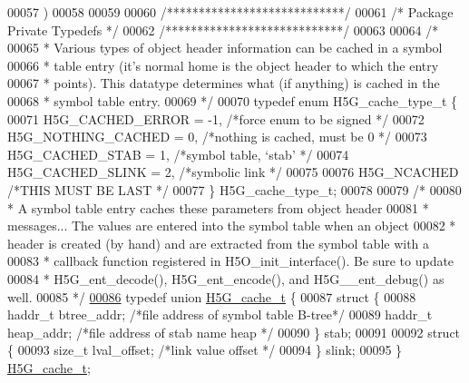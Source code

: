 \begin{DoxyCode}
00057 \textcolor{preprocessor}{    )}
00058 
00059 
00060 \textcolor{comment}{/****************************/}
00061 \textcolor{comment}{/* Package Private Typedefs */}
00062 \textcolor{comment}{/****************************/}
00063 
00064 \textcolor{comment}{/*}
00065 \textcolor{comment}{ * Various types of object header information can be cached in a symbol}
00066 \textcolor{comment}{ * table entry (it's normal home is the object header to which the entry}
00067 \textcolor{comment}{ * points).  This datatype determines what (if anything) is cached in the}
00068 \textcolor{comment}{ * symbol table entry.}
00069 \textcolor{comment}{ */}
00070 \textcolor{keyword}{typedef} \textcolor{keyword}{enum} H5G\_cache\_type\_t \{
00071     H5G\_CACHED\_ERROR    = -1,   \textcolor{comment}{/*force enum to be signed            */}
00072     H5G\_NOTHING\_CACHED  = 0,    \textcolor{comment}{/*nothing is cached, must be 0               */}
00073     H5G\_CACHED\_STAB     = 1,    \textcolor{comment}{/*symbol table, `stab'                       */}
00074     H5G\_CACHED\_SLINK    = 2,    \textcolor{comment}{/*symbolic link                  */}
00075 
00076     H5G\_NCACHED                 \textcolor{comment}{/*THIS MUST BE LAST                          */}
00077 \} H5G\_cache\_type\_t;
00078 
00079 \textcolor{comment}{/*}
00080 \textcolor{comment}{ * A symbol table entry caches these parameters from object header}
00081 \textcolor{comment}{ * messages...  The values are entered into the symbol table when an object}
00082 \textcolor{comment}{ * header is created (by hand) and are extracted from the symbol table with a}
00083 \textcolor{comment}{ * callback function registered in H5O\_init\_interface().  Be sure to update}
00084 \textcolor{comment}{ * H5G\_ent\_decode(), H5G\_ent\_encode(), and H5G\_\_ent\_debug() as well.}
00085 \textcolor{comment}{ */}
\hyperlink{union_h5_g__cache__t}{00086} \textcolor{keyword}{typedef} \textcolor{keyword}{union }\hyperlink{union_h5_g__cache__t}{H5G\_cache\_t} \{
00087     \textcolor{keyword}{struct }\{
00088         haddr\_t btree\_addr;             \textcolor{comment}{/*file address of symbol table B-tree*/}
00089         haddr\_t heap\_addr;              \textcolor{comment}{/*file address of stab name heap     */}
00090     \} stab;
00091 
00092     \textcolor{keyword}{struct }\{
00093     \textcolor{keywordtype}{size\_t}  lval\_offset;        \textcolor{comment}{/*link value offset          */}
00094     \} slink;
00095 \} \hyperlink{union_h5_g__cache__t}{H5G\_cache\_t};

\end{DoxyCode}
